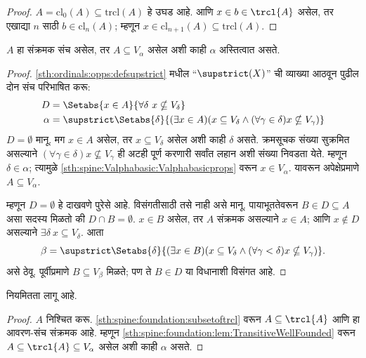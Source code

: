 \begin{proof}
$A = \text{cl}_0(A) \subseteq \text{trcl}(A)$ हे उघड आहे. आणि $x
\in b \in \trcl{A}$ असेल, तर एखाद्या $n$ साठी $b \in \text{cl}_n(A)$; म्हणून $x
\in \text{cl}_{n+1}(A) \subseteq \text{trcl}(A)$.
\end{proof}

\begin{lem}\label{sth:spine:foundation:lem:TransitiveWellFounded}
$A$ हा संक्रमक संच असेल, तर $A \subseteq V_\alpha$ असेल अशी काही $\alpha$ अस्तित्वात असते.
\end{lem}

\begin{proof}
\ref{sth:ordinals:opps:defsupstrict} मधील ``$\supstrict(X)$'' ची व्याख्या आठवून पुढील दोन संच परिभाषित करू:
\begin{align*}
	D  &= \Setabs{x \in A}{\forall \delta\ x \nsubseteq V_\delta}\\
	\alpha &= \supstrict\Setabs{\delta}{(\exists x \in A)
	(x \subseteq V_\delta \land (\forall \gamma \in \delta)x \nsubseteq V_\gamma)}
\end{align*}
$D = \emptyset$ मानू. मग $x \in A$ असेल, तर $x \subseteq V_\delta$ असेल अशी काही $\delta$ असते. क्रमसूचक संख्या सुक्रमित असल्याने $(\forall \gamma \in \delta)x \nsubseteq V_\gamma$ ही अटही पूर्ण करणारी सर्वांत लहान अशी संख्या निवडता येते. म्हणून $\delta \in \alpha$; त्यामुळे \ref{sth:spine:Valphabasic:Valphabasicprops} वरून $x \in V_\alpha$. यावरून अपेक्षेप्रमाणे $A \subseteq
V_{\alpha}$.

म्हणून $D = \emptyset$ हे दाखवणे पुरेसे आहे. विसंगतीसाठी तसे नाही असे मानू. पायाभूततेवरून $B \in D \subseteq A$ असा सदस्य मिळतो की $D \cap B
= \emptyset$. $x \in B$ असेल, तर $A$ संक्रमक असल्याने $x \in A$; आणि $x \notin D$ असल्याने $\exists \delta\ x \subseteq
V_\delta$. आता
\[
	\beta = \supstrict\Setabs{\delta}{(\exists x \in B)(x \subseteq V_\delta \land (\forall \gamma < \delta)x \nsubseteq V_\gamma)}.
\]
असे ठेवू. पूर्वीप्रमाणे $B \subseteq V_\beta$ मिळते; पण ते $B \in
D$ या विधानाशी विसंगत आहे.
\end{proof}

\begin{thm}\label{sth:spine:foundation:zfentailsregularity}
नियमितता लागू आहे.
\end{thm}

\begin{proof}
$A$ निश्चित करू. \ref{sth:spine:foundation:subsetoftrcl} वरून $A \subseteq \trcl{A}$ आणि हा आवरण-संच संक्रमक आहे. म्हणून \ref{sth:spine:foundation:lem:TransitiveWellFounded} वरून $A \subseteq \trcl{A} \subseteq V_\alpha$ असेल अशी काही $\alpha$ असते.
\end{proof}

